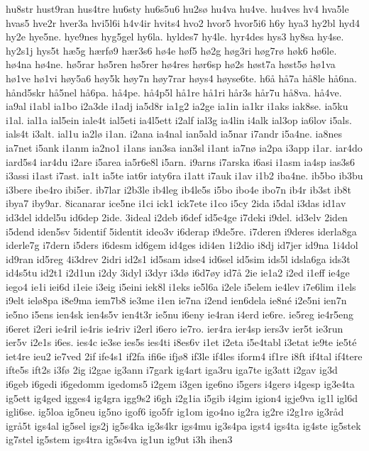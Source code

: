 {hu8str
hust9ran
hus4tre
hu6sty
hu6s5u6
hu2sø
hu4va
hu4ve.
hu4ves
hv4
hva5le
hvas5
hve2r
hver3a
hvi5l6i
h4v4ir
hvits4
hvo2
hvor5
hvor5i6
h6y
hya3
hy2bl
hyd4
hy2e
hye5ne.
hye9nes
hyg5gel
hy6la.
hyldes7
hy4le.
hyr4des
hys3
hy8sa
hy4se.
hy2s1j
hys5t
hæ5g
hærfø9
hær3s6
hø4e
høf5
hø2g
høg3ri
høg7rø
høk6
hø6le.
hø4na
hø4ne.
hø5rar
hø5ren
hø5rer
hø4res
hør6sp
hø2s
høst7a
høst5ø
hø1va
hø1ve
hø1vi
høy5a6
høy5k
høy7n
høy7rar
høys4
høyse6te.
h6å
hå7a
hå8le
hå6na.
hånd5skr
hå5nel
hå6pa.
hå4pe.
hå4p5l
hå1re
hå1ri
hår3s
hår7u
hå8va.
hå4ve.
ia9al
i1abl
ia1bo
i2a3de
i1adj
ia5d8r
ia1g2
ia2ge
ia1in
ia1kr
i1aks
iak8se.
ia5ku
i1al.
ial1a
ial5ein
iale4t
ial5eti
ia4l5ett
i2alf
ial3g
ia4lin
i4alk
ial3op
ia6lov
i5als.
ials4t
i3alt.
ial1u
ia2lø
i1an.
i2ana
ia4nal
ian5ald
ia5nar
i7andr
i5a4ne.
ia8nes
ia7net
i5ank
i1anm
ia2no1
i1ans
ian3sa
ian3sl
i1ant
ia7nø
ia2pa
i3app
i1ar.
iar4do
iard5s4
iar4du
i2are
i5area
ia5r6e8l
i5arn.
i9arns
i7arska
i6asi
i1asm
ia4sp
ias3s6
i3assi
i1ast
i7ast.
ia1t
ia5te
iat6r
iaty6ra
i1att
i7auk
i1av
i1b2
iba4ne.
ib5bo
ib3bu
i3bere
ibe4ro
ibi5er.
ib7lar
i2b3le
ib4leg
ib4le5s
i5bo
ibo4e
ibo7n
ib4r
ib3st
ib8t
ibya7
iby9ar.
8icanarar
ice5ne
i1ci
ick1
ick7ete
i1co
i5cy
2ida
i5dal
i3das
id1av
id3del
iddel5u
id6dep
2ide.
3ideal
i2deb
i6def
id5e4ge
i7deki
i9del.
id3elv
2iden
i5dend
iden5sv
5identif
5identit
ideo3v
i6derap
i9de5re.
i7deren
i9deres
iderla8ga
iderle7g
i7dern
i5ders
i6desm
id6gem
id4ges
idi4en
1i2dio
i8dj
id7jer
id9na
1i4dol
id9ran
id5reg
4i3drev
2idri
id2s1
id5sam
idse4
id6sel
id5sim
ids5l
idsla6ga
ids3t
id4s5tu
id2t1
i2d1un
i2dy
3idyl
i3dyr
i3dø
i6d7øy
id7å
2ie
ie1a2
i2ed
i1eff
ie4ge
iego4
ie1i
iei6d
i1eie
i3eig
i5eini
iek8l
i1eks
ie5l6a
i2ele
i5elem
ie4lev
i7e6lim
i1els
i9elt
ielø8pa
i8e9ma
iem7b8
ie3me
i1en
ie7na
i2end
ien6dela
ie8né
i2e5ni
ien7n
ie5no
i5ens
ien4sk
ien4s5v
ien4t3r
ie5nu
i6eny
ie4ran
i4erd
ie6re.
ie5reg
ie4r5eng
i6eret
i2eri
ie4ril
ie4ris
ie4riv
i2erl
i6ero
ie7ro.
ier4ra
ier4sp
iers3v
ier5t
ie3run
ier5v
i2e1s
i6es.
ies4c
ie3se
ies5s
ies4ti
i8es6v
i1et
i2eta
i5e4tabl
i3etat
ie9te
ie5té
iet4re
ieu2
ie7ved
2if
ife4s1
if2fa
ifi6e
ifjø8
if3le
if4les
iform4
if1re
i8ft
if4tal
if4tere
ifte5s
ift2s
i3fø
2ig
i2gae
ig3ann
i7gark
ig4art
iga3ru
iga7te
ig3att
i2gav
ig3d
i6geb
i6gedi
i6gedomm
igedoms5
i2gem
i3gen
ige6no
i5gers
i4gerø
i4gesp
ig3e4ta
ig5ett
ig4ged
igges4
ig4gra
igg9s2
i6gh
i2g1ia
i5gib
i4gim
igion4
igje9va
ig1l
igl6d
igli6se.
ig5loa
ig5neu
ig5no
igof6
igo5fr
ig1om
igo4no
ig2ra
ig2re
i2g1rø
ig3råd
igrå5t
igs4al
ig5sel
igs2j
ig5s4ka
ig3s4kr
igs4mu
ig3s4pa
igst4
igs4ta
ig4ste
ig5stek
ig7stel
ig5stem
igs4tra
ig5s4va
ig1un
ig9ut
i3h
ihen3
}
